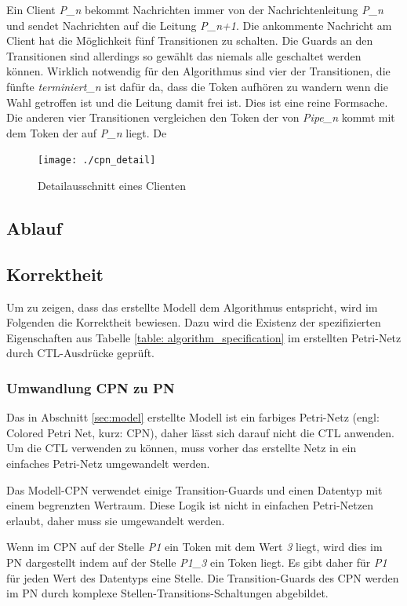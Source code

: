 Ein Client \textit{P_{n}} bekommt Nachrichten immer von der Nachrichtenleitung \textit{P_n} und sendet Nachrichten auf die Leitung \textit{P_{n+1}}. Die ankommente Nachricht am Client hat die Möglichkeit fünf Transitionen zu schalten. Die Guards an den Transitionen sind allerdings so gewählt das niemals alle geschaltet werden können. Wirklich notwendig für den Algorithmus sind vier der Transitionen, die fünfte \textit{terminiert_n} ist dafür da, dass die Token aufhören zu wandern wenn die Wahl getroffen ist und die Leitung damit frei ist. Dies ist eine reine Formsache. Die anderen vier Transitionen vergleichen den Token der von \textit{Pipe_n} kommt mit dem Token der auf \textit{P_n} liegt. De

\begin{figure}[H]
\centering
\texttt{[image: ./cpn\_detail]}
\caption{Detailausschnitt eines Clienten}
\label{fig:cpn_detail}
\end{figure}

\subsection{Ablauf}

\subsection{Korrektheit}
Um zu zeigen, dass das erstellte Modell dem Algorithmus entspricht, wird im Folgenden die Korrektheit bewiesen. Dazu wird die Existenz der spezifizierten Eigenschaften aus Tabelle \ref{table: algorithm_specification} im erstellten Petri-Netz durch CTL-Ausdrücke geprüft.

\subsubsection{Umwandlung CPN zu PN}
Das in Abschnitt \ref{sec:model} erstellte Modell ist ein farbiges Petri-Netz (engl: Colored Petri Net, kurz: CPN), daher lässt sich darauf nicht die CTL anwenden. Um die CTL verwenden zu können, muss vorher das erstellte Netz in ein einfaches Petri-Netz umgewandelt werden.

Das Modell-CPN verwendet einige Transition-Guards und einen Datentyp mit einem begrenzten Wertraum. Diese Logik ist nicht in einfachen Petri-Netzen erlaubt, daher muss sie umgewandelt werden.

Wenn im CPN auf der Stelle \textit{P1} ein Token mit dem Wert \textit{3} liegt, wird dies im PN dargestellt indem auf der Stelle \textit{P1\_3} ein Token liegt. Es gibt daher für \textit{P1} für jeden Wert des Datentyps eine Stelle. Die Transition-Guards des CPN werden im PN durch komplexe Stellen-Transitions-Schaltungen abgebildet.

